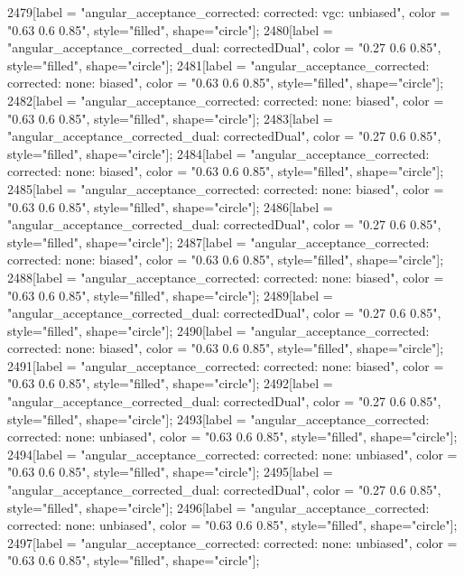 {	2479[label = "angular_acceptance_corrected\nangacc: corrected\ncsp: vgc\ntrigger: unbiased", color = "0.63 0.6 0.85", style="filled", shape="circle"];
	2480[label = "angular_acceptance_corrected_dual\nstep: correctedDual", color = "0.27 0.6 0.85", style="filled", shape="circle"];
	2481[label = "angular_acceptance_corrected\nangacc: corrected\ncsp: none\ntrigger: biased", color = "0.63 0.6 0.85", style="filled", shape="circle"];
	2482[label = "angular_acceptance_corrected\nangacc: corrected\ncsp: none\ntrigger: biased", color = "0.63 0.6 0.85", style="filled", shape="circle"];
	2483[label = "angular_acceptance_corrected_dual\nstep: correctedDual", color = "0.27 0.6 0.85", style="filled", shape="circle"];
	2484[label = "angular_acceptance_corrected\nangacc: corrected\ncsp: none\ntrigger: biased", color = "0.63 0.6 0.85", style="filled", shape="circle"];
	2485[label = "angular_acceptance_corrected\nangacc: corrected\ncsp: none\ntrigger: biased", color = "0.63 0.6 0.85", style="filled", shape="circle"];
	2486[label = "angular_acceptance_corrected_dual\nstep: correctedDual", color = "0.27 0.6 0.85", style="filled", shape="circle"];
	2487[label = "angular_acceptance_corrected\nangacc: corrected\ncsp: none\ntrigger: biased", color = "0.63 0.6 0.85", style="filled", shape="circle"];
	2488[label = "angular_acceptance_corrected\nangacc: corrected\ncsp: none\ntrigger: biased", color = "0.63 0.6 0.85", style="filled", shape="circle"];
	2489[label = "angular_acceptance_corrected_dual\nstep: correctedDual", color = "0.27 0.6 0.85", style="filled", shape="circle"];
	2490[label = "angular_acceptance_corrected\nangacc: corrected\ncsp: none\ntrigger: biased", color = "0.63 0.6 0.85", style="filled", shape="circle"];
	2491[label = "angular_acceptance_corrected\nangacc: corrected\ncsp: none\ntrigger: biased", color = "0.63 0.6 0.85", style="filled", shape="circle"];
	2492[label = "angular_acceptance_corrected_dual\nstep: correctedDual", color = "0.27 0.6 0.85", style="filled", shape="circle"];
	2493[label = "angular_acceptance_corrected\nangacc: corrected\ncsp: none\ntrigger: unbiased", color = "0.63 0.6 0.85", style="filled", shape="circle"];
	2494[label = "angular_acceptance_corrected\nangacc: corrected\ncsp: none\ntrigger: unbiased", color = "0.63 0.6 0.85", style="filled", shape="circle"];
	2495[label = "angular_acceptance_corrected_dual\nstep: correctedDual", color = "0.27 0.6 0.85", style="filled", shape="circle"];
	2496[label = "angular_acceptance_corrected\nangacc: corrected\ncsp: none\ntrigger: unbiased", color = "0.63 0.6 0.85", style="filled", shape="circle"];
	2497[label = "angular_acceptance_corrected\nangacc: corrected\ncsp: none\ntrigger: unbiased", color = "0.63 0.6 0.85", style="filled", shape="circle"];
}
